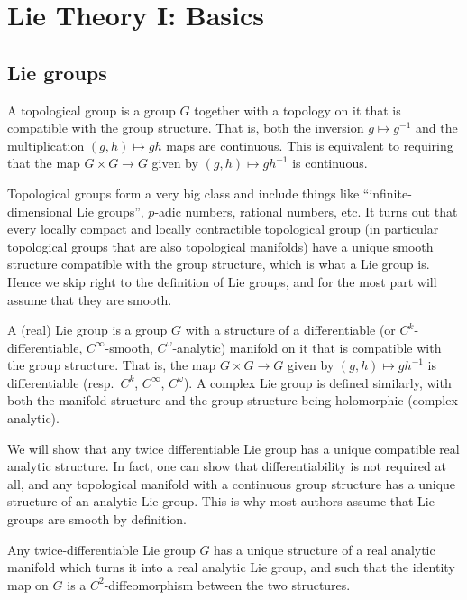 \section{Lie Theory I: Basics}

\subsection{Lie groups}

\begin{defn}
    A topological group is a group $G$ together with a topology on it that is compatible with the group structure. That is, both the inversion $g\mapsto g^{-1}$ and the multiplication $(g,h)\mapsto gh$ maps are continuous. This is equivalent to requiring that the map $G\times G\to G$ given by $(g,h)\mapsto gh^{-1}$ is continuous.
\end{defn}

Topological groups form a very big class and include things like ``infinite-dimensional Lie groups'', $p$-adic numbers, rational numbers, etc. It turns out that every locally compact and locally contractible topological group (in particular topological groups that are also topological manifolds) have a unique smooth structure compatible with the group structure, which is what a Lie group is. Hence we skip right to the definition of Lie groups, and for the most part will assume that they are smooth.

\begin{defn}
    A (real) Lie group is a group $G$ with a structure of a differentiable (or $C^k$-differentiable, $C^\infty$-smooth, $C^\omega$-analytic) manifold on it that is compatible with the group structure. That is, the map $G\times G\to G$ given by $(g,h)\mapsto gh^{-1}$ is differentiable (resp.~$C^k$, $C^\infty$, $C^\omega$). A complex Lie group is defined similarly, with both the manifold structure and the group structure being holomorphic (complex analytic).
\end{defn}

We will show that any twice differentiable Lie group has a unique compatible real analytic structure. In fact, one can show that differentiability is not required at all, and any topological manifold with a continuous group structure has a unique structure of an analytic Lie group. This is why most authors assume that Lie groups are smooth by definition.

\begin{prop}[{{\cite[Thm.~1.6.3]{DK}}}]
    Any twice-differentiable Lie group $G$ has a unique structure of a real analytic manifold which turns it into a real analytic Lie group, and such that the identity map on $G$ is a $C^2$-diffeomorphism between the two structures.
\end{prop}


